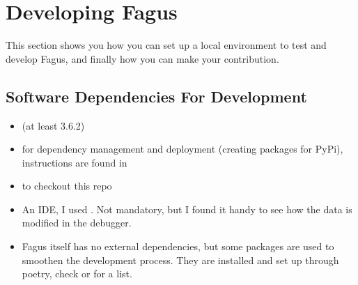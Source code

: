 \documentclass[a4paper,10pt,english]{sphinxmanual}
\begin{document}
\section{Developing Fagus}
\label{\detokenize{CONTRIBUTING:developing-fagus}}
\sphinxAtStartPar
This section shows you how you can set up a local environment to test and develop Fagus, and finally how you can make your contribution.


\subsection{Software Dependencies For Development}
\label{\detokenize{CONTRIBUTING:software-dependencies-for-development}}\begin{itemize}
\item {}
\sphinxAtStartPar
{} (at least 3.6.2)

\item {}
\sphinxAtStartPar
{} for dependency management and deployment (creating packages for PyPi), instructions are found in {\hyperref[\detokenize{CONTRIBUTING:setting-up-a-local-fagus-developing-environment}]{}}

\item {}
\sphinxAtStartPar
{} to checkout this repo

\item {}
\sphinxAtStartPar
An IDE, I used . Not mandatory, but I found it handy to see how the data is modified in the debugger.

\item {}
\sphinxAtStartPar
Fagus itself has no external dependencies, but some packages are used to smoothen the development process. They are installed and set up through poetry, check  or {\hyperref[\detokenize{CONTRIBUTING:code-styling-guidelines}]{}} for a list.

\end{itemize}
\end{document}
